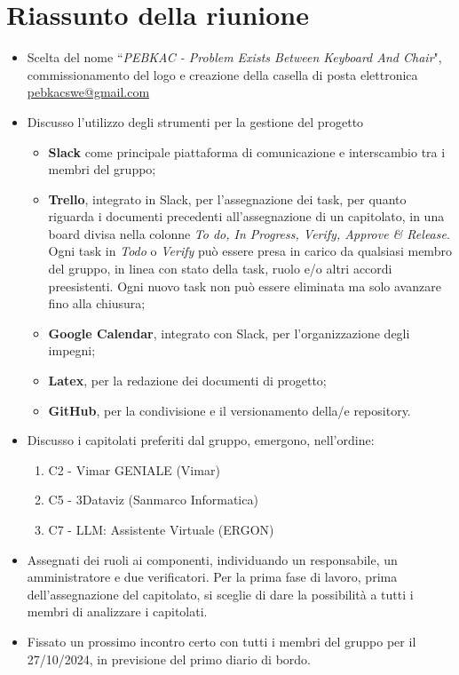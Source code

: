 \section{Riassunto della riunione}
\begin{itemize}
    \item Scelta del nome ``\textit{PEBKAC - Problem Exists Between Keyboard And Chair}", commissionamento del logo e creazione della casella di posta elettronica \href{mailto:pebkacswe@gmail.com}{pebkacswe@gmail.com}
  \item Discusso  l'utilizzo degli strumenti per la gestione del progetto
  \begin{itemize}
    \item \textbf{Slack} come principale piattaforma di comunicazione e interscambio tra i membri del gruppo;
    \item \textbf{Trello}, integrato in Slack, per l'assegnazione dei task,  per quanto riguarda i documenti precedenti all'assegnazione di un capitolato, in una board divisa nella colonne \textit{To do, In Progress, Verify, Approve \& Release}. Ogni task in \textit{Todo} o \textit{Verify} può essere presa in carico da qualsiasi membro del gruppo, in linea con stato della task, ruolo e/o altri accordi preesistenti. Ogni nuovo task non può essere eliminata ma solo avanzare fino alla chiusura;
    \item \textbf{Google Calendar}, integrato con Slack, per l'organizzazione degli impegni;
    \item \textbf{Latex}, per la redazione dei documenti di progetto;
  \item \textbf{GitHub}, per la condivisione e il versionamento della/e repository.
  \end{itemize}
    \item Discusso i capitolati preferiti dal gruppo, emergono, nell'ordine:
    \begin{enumerate}
        \item C2 - Vimar GENIALE (Vimar)
        \item C5 - 3Dataviz (Sanmarco Informatica)
        \item C7 - LLM: Assistente Virtuale (ERGON)
    \end{enumerate}
  \item Assegnati dei ruoli ai componenti, individuando un responsabile, un amministratore e due verificatori. Per la prima fase di lavoro, prima dell'assegnazione del capitolato, si sceglie di dare la possibilità a tutti i membri di analizzare i capitolati.
  \item Fissato un prossimo incontro certo con tutti i membri del gruppo per il 27/10/2024, in previsione del primo diario di bordo.
  

\end{itemize}